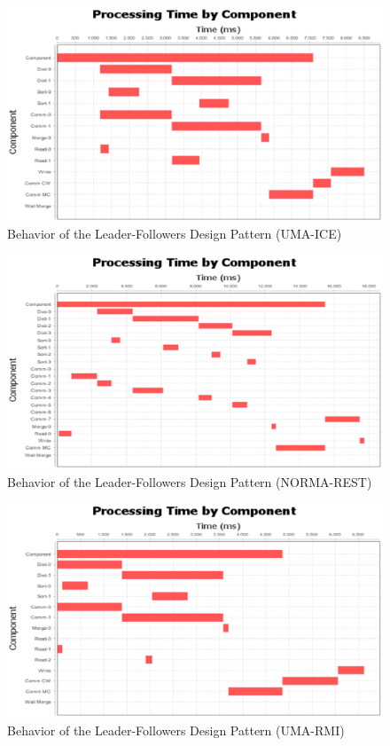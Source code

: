 \begin{figure}[H]
	\centering
	\includegraphics[trim=0.5cm 17cm -5cm 1cm, scale=0.9]{fig/LFUmaIce438Behavior.eps}
	\caption{Behavior of the Leader-Followers Design Pattern (UMA-ICE)}
	\label{fig:leaderFollowersBehaviorIce}
\end{figure}

\begin{figure}[H]
	\centering
	\includegraphics[trim=0.5cm 17cm -5cm 1cm, scale=0.9]{fig/LFNormaRest242Behavior.eps}
	\caption{Behavior of the Leader-Followers Design Pattern (NORMA-REST)}
	\label{fig:leaderFollowersBehaviorRest}
\end{figure}

\begin{figure}[H]
	\centering
	\includegraphics[trim=0.5cm 17cm -5cm 1cm, scale=0.9]{fig/LFUmaRmi422Behavior.eps}
	\caption{Behavior of the Leader-Followers Design Pattern (UMA-RMI)}
	\label{fig:leaderFollowersBehaviorRmi}
\end{figure}


